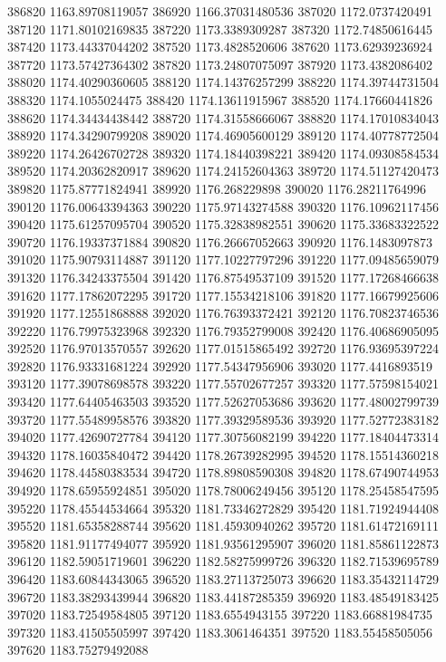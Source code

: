 {386820 1163.89708119057
386920 1166.37031480536
387020 1172.0737420491
387120 1171.80102169835
387220 1173.3389309287
387320 1172.74850616445
387420 1173.44337044202
387520 1173.4828520606
387620 1173.62939236924
387720 1173.57427364302
387820 1173.24807075097
387920 1173.4382086402
388020 1174.40290360605
388120 1174.14376257299
388220 1174.39744731504
388320 1174.1055024475
388420 1174.13611915967
388520 1174.17660441826
388620 1174.34434438442
388720 1174.31558666067
388820 1174.17010834043
388920 1174.34290799208
389020 1174.46905600129
389120 1174.40778772504
389220 1174.26426702728
389320 1174.18440398221
389420 1174.09308584534
389520 1174.20362820917
389620 1174.24152604363
389720 1174.51127420473
389820 1175.87771824941
389920 1176.268229898
390020 1176.28211764996
390120 1176.00643394363
390220 1175.97143274588
390320 1176.10962117456
390420 1175.61257095704
390520 1175.32838982551
390620 1175.33683322522
390720 1176.19337371884
390820 1176.26667052663
390920 1176.1483097873
391020 1175.90793114887
391120 1177.10227797296
391220 1177.09485659079
391320 1176.34243375504
391420 1176.87549537109
391520 1177.17268466638
391620 1177.17862072295
391720 1177.15534218106
391820 1177.16679925606
391920 1177.12551868888
392020 1176.76393372421
392120 1176.70823746536
392220 1176.79975323968
392320 1176.79352799008
392420 1176.40686905095
392520 1176.97013570557
392620 1177.01515865492
392720 1176.93695397224
392820 1176.93331681224
392920 1177.54347956906
393020 1177.4416893519
393120 1177.39078698578
393220 1177.55702677257
393320 1177.57598154021
393420 1177.64405463503
393520 1177.52627053686
393620 1177.48002799739
393720 1177.55489958576
393820 1177.39329589536
393920 1177.52772383182
394020 1177.42690727784
394120 1177.30756082199
394220 1177.18404473314
394320 1178.16035840472
394420 1178.26739282995
394520 1178.15514360218
394620 1178.44580383534
394720 1178.89808590308
394820 1178.67490744953
394920 1178.65955924851
395020 1178.78006249456
395120 1178.25458547595
395220 1178.45544534664
395320 1181.73346272829
395420 1181.71924944408
395520 1181.65358288744
395620 1181.45930940262
395720 1181.61472169111
395820 1181.91177494077
395920 1181.93561295907
396020 1181.85861122873
396120 1182.59051719601
396220 1182.58275999726
396320 1182.71539695789
396420 1183.60844343065
396520 1183.27113725073
396620 1183.35432114729
396720 1183.38293439944
396820 1183.44187285359
396920 1183.48549183425
397020 1183.72549584805
397120 1183.6554943155
397220 1183.66881984735
397320 1183.41505505997
397420 1183.3061464351
397520 1183.55458505056
397620 1183.75279492088
}
